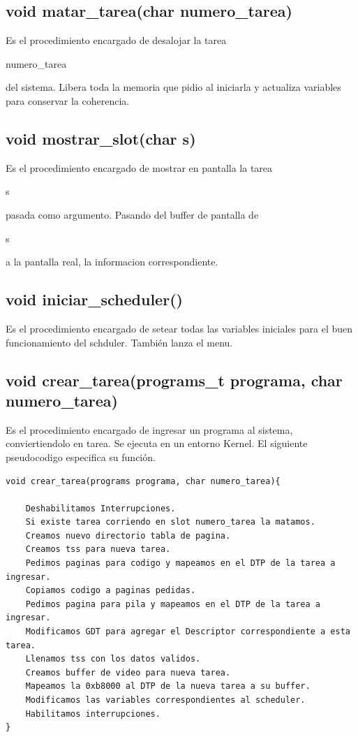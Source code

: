 \documentclass[a4paper,10pt]{article}
\begin{document}
\subsection*{ void matar\_tarea(char numero\_tarea) }
Es el procedimiento encargado de desalojar la tarea \begin{it}numero\_tarea\end{it} del sistema. Libera toda la memoria que pidio al iniciarla y actualiza variables para conservar la coherencia.

\subsection*{void mostrar\_slot(char s)}
Es el procedimiento encargado de mostrar en pantalla la tarea \begin{it}s\end{it} pasada como argumento. Pasando del buffer de pantalla de \begin{it}s\end{it} a la pantalla real, la informacion correspondiente.

\subsection*{void iniciar\_scheduler()}
Es el procedimiento encargado de setear todas las variables iniciales para el buen funcionamiento del schduler. También lanza el menu.

\subsection*{void crear\_tarea(programs\_t programa, char numero\_tarea)}
Es el procedimiento encargado de ingresar un programa al sistema, conviertiendolo en tarea. Se ejecuta en un entorno Kernel.
El siguiente pseudocodigo especifica su función.
\begin{verbatim}
void crear_tarea(programs programa, char numero_tarea){
    
    Deshabilitamos Interrupciones.
    Si existe tarea corriendo en slot numero_tarea la matamos.
    Creamos nuevo directorio tabla de pagina.
    Creamos tss para nueva tarea.
    Pedimos paginas para codigo y mapeamos en el DTP de la tarea a ingresar.
    Copiamos codigo a paginas pedidas.
    Pedimos pagina para pila y mapeamos en el DTP de la tarea a ingresar.
    Modificamos GDT para agregar el Descriptor correspondiente a esta tarea.
    Llenamos tss con los datos validos.
    Creamos buffer de video para nueva tarea.
    Mapeamos la 0xb8000 al DTP de la nueva tarea a su buffer.
    Modificamos las variables correspondientes al scheduler.
    Habilitamos interrupciones.
}
\end{verbatim}
\end{document}
